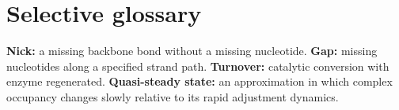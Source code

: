 \section*{Selective glossary}
\textbf{Nick:} a missing backbone bond without a missing nucleotide.
\textbf{Gap:} missing nucleotides along a specified strand path.
\textbf{Turnover:} catalytic conversion with enzyme regenerated.
\textbf{Quasi-steady state:} an approximation in which complex occupancy changes slowly relative to its rapid adjustment dynamics.
